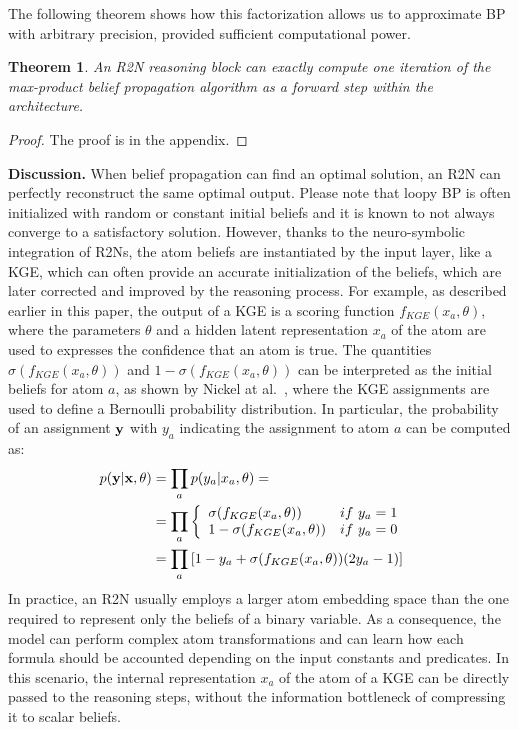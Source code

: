 \documentclass[journal]{IEEEtran}
\newtheorem{theorem}{Theorem}
\begin{document}
The following theorem shows how this factorization allows us to approximate BP with arbitrary precision, provided sufficient computational power.
\begin{theorem}
	\label{the:r2n_approx_bp}
	An R2N reasoning block can exactly compute one iteration of the max-product belief propagation algorithm as a forward step within the architecture.
\end{theorem}
\begin{proof} The proof is in the appendix.
\end{proof}

\noindent
{\bf Discussion. } When belief propagation can find an optimal solution, an R2N can perfectly reconstruct the same optimal output. 
Please note that loopy BP is often initialized with random or constant initial beliefs and it is known to not always converge to a satisfactory solution. However, thanks to the neuro-symbolic integration of R2Ns, the atom beliefs are instantiated by the input layer, like a KGE, which can often provide an accurate initialization of the beliefs, which are later corrected and improved by the reasoning process.
For example, as described earlier in this paper, the output of a KGE is a scoring function $f_{KGE}(x_a, \theta)$, where the parameters $\theta$ and a hidden latent representation $x_a$ of the atom are used to expresses the confidence that an atom is true.
The quantities $\sigma (f_{KGE}(x_a, \theta))$ and $1-\sigma (f_{KGE}(x_a, \theta))$ can be interpreted as the initial beliefs for atom $a$, as shown 
by Nickel at al.~\cite{nickel2015review}, where the KGE assignments are used to define a Bernoulli probability distribution. In particular, the probability of an assignment ${\bf y}$ with $y_a$ indicating the assignment to atom $a$ can be computed as:
\begin{align*}
p({\bf y}| {\bf x}, \theta) &= \prod_a p(y_a|x_a, \theta) =  & \\
&= \prod_a \left\{ \begin{array}{ll}
\sigma (f_{KGE}(x_a, \theta))         & if~y_a=1\\
1 - \sigma (f_{KGE}(x_a, \theta)) & if~y_a=0
\end{array} \right.  \\
&= \prod_a \left[ 1 - y_a + \sigma (f_{KGE}(x_a, \theta)) (2y_a - 1) \right]
\end{align*}
In practice, an R2N usually employs a larger atom embedding space than the one required to  represent only the beliefs of a binary variable. As a consequence, the model can perform complex atom transformations and can learn how each formula should be accounted depending on the input constants and predicates. In this scenario, the internal representation $x_a$ of the atom of a KGE can be directly passed to the reasoning steps, without the information bottleneck of compressing it to scalar beliefs.
\end{document}

